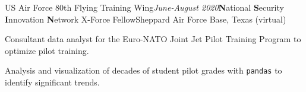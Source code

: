 \begin{rSubsection}{US Air Force 80th Flying Training Wing}{\em June-August 2020}{\textbf{N}ational \textbf{S}ecurity \textbf{I}nnovation \textbf{N}etwork X-Force Fellow}{Sheppard Air Force Base, Texas (virtual)}
\item Consultant data analyst for the Euro-NATO Joint Jet Pilot Training Program to optimize pilot training.
\item Analysis and visualization of decades of student pilot grades with \texttt{pandas} to identify significant trends.
\end{rSubsection}